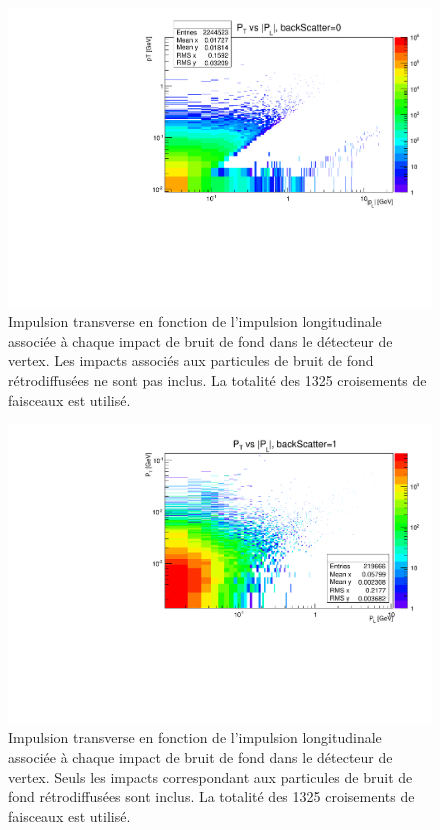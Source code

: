   \medskip

  \begin{figure}[!htb]
    \begin{center}
      \includegraphics[scale=0.55]{./figures/Beamstrahlung/pT_vs_pL_NoBackScatter.pdf}
      \caption{Impulsion transverse en fonction de l'impulsion longitudinale associ\'ee \`a chaque impact de bruit de fond dans le d\'etecteur de vertex. Les impacts associ\'es aux particules de bruit de fond r\'etrodiffus\'ees ne sont pas inclus. La totalit\'e des 1325 croisements de faisceaux est utilis\'e.}
      \label{fig:pT_vs_pL_NoBack}
    \end{center}
  \end{figure}
  
  \begin{figure}[!htb]
    \begin{center}
      \includegraphics[scale=0.55]{./figures/Beamstrahlung/pT_vs_pL_backScatter.pdf}
      \caption{Impulsion transverse en fonction de l'impulsion longitudinale associ\'ee \`a chaque impact de bruit de fond dans le d\'etecteur de vertex. Seuls les impacts correspondant aux particules de bruit de fond r\'etrodiffus\'ees sont inclus. La totalit\'e des 1325 croisements de faisceaux est utilis\'e.}
      \label{fig:pT_vs_pL_Back}
    \end{center}
  \end{figure}
  
